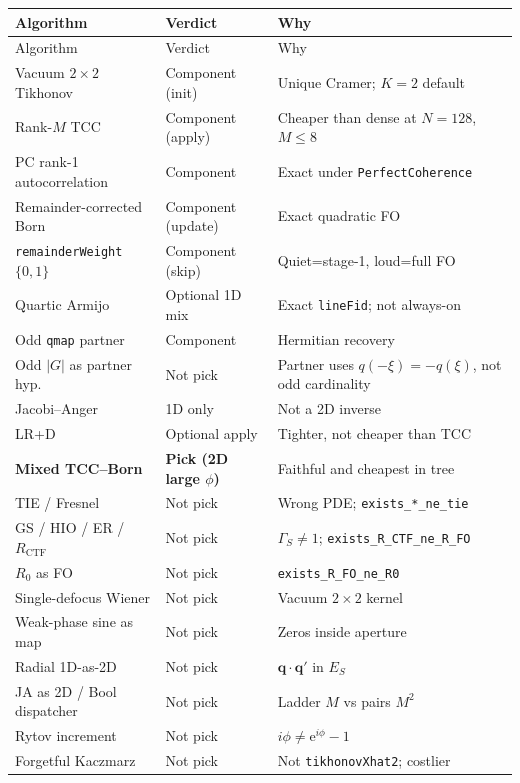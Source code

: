 \documentclass[11pt,a4paper]{article}
\theoremstyle{definition}
\theoremstyle{remark}
\newcommand{\ee}{\mathrm{e}}
\newcommand{\RCTF}{R_{\mathrm{CTF}}}
\begin{document}
{\small
\setlength{\tabcolsep}{4pt}
\begin{longtable}{@{}p{4.2cm}p{2.0cm}p{7.0cm}@{}}
\toprule
Algorithm & Verdict & Why \\
\midrule
\endfirsthead
\toprule
Algorithm & Verdict & Why \\
\midrule
\endhead
\bottomrule
\endlastfoot
Vacuum $2\times 2$ Tikhonov & Component (init) & Unique Cramer; $K=2$ default \\
Rank-$M$ TCC & Component (apply) & Cheaper than dense at $N=128$, $M\le 8$ \\
PC rank-1 autocorrelation & Component & Exact under \texttt{PerfectCoherence} \\
Remainder-corrected Born & Component (update) & Exact quadratic FO \\
\texttt{remainderWeight} $\{0,1\}$ & Component (skip) & Quiet=stage-1, loud=full FO \\
Quartic Armijo & Optional 1D mix & Exact \texttt{lineFid}; not always-on \\
Odd \texttt{qmap} partner & Component & Hermitian recovery \\
Odd $\lvert G\rvert$ as partner hyp. & Not pick & Partner uses $q(-\xi)=-q(\xi)$, not odd cardinality \\
Jacobi--Anger & 1D only & Not a 2D inverse \\
LR+D & Optional apply & Tighter, not cheaper than TCC \\
\textbf{Mixed TCC--Born} & \textbf{Pick (2D large $\phi$)} & Faithful and cheapest in tree \\
TIE / Fresnel & Not pick & Wrong PDE; \texttt{exists\_*\_ne\_tie} \\
GS / HIO / ER / $\RCTF$ & Not pick & $\Gamma_S\neq 1$; \texttt{exists\_R\_CTF\_ne\_R\_FO} \\
$R_0$ as FO & Not pick & \texttt{exists\_R\_FO\_ne\_R0} \\
Single-defocus Wiener & Not pick & Vacuum $2\times 2$ kernel \\
Weak-phase sine as map & Not pick & Zeros inside aperture \\
Radial 1D-as-2D & Not pick & $\mathbf{q}\cdot\mathbf{q}'$ in $E_S$ \\
JA as 2D / Bool dispatcher & Not pick & Ladder $M$ vs pairs $M^2$ \\
Rytov increment & Not pick & $i\phi\neq \ee^{i\phi}-1$ \\
Forgetful Kaczmarz & Not pick & Not \texttt{tikhonovXhat2}; costlier \\

\end{longtable}}
\end{document}

